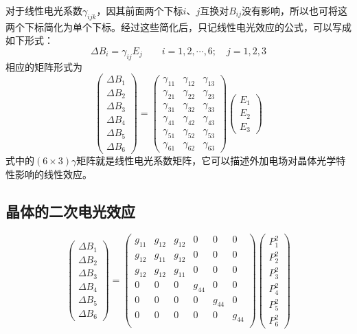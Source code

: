 \documentclass[cn,10pt,chinesefont=founder,math=mtpro2,cite=super,toc=onecol,twoside]{elegantbook}
\begin{document}
对于线性电光系数$\gamma_{ijk}$，因其前面两个下标$i$、$j$互换对$B_{ij}$没有影响，所以也可将这两个下标简化为单个下标。经过这些简化后，只记线性电光效应的公式，可以写成如下形式：
\begin{equation}
\Delta B_i=\gamma_{ij}E_{j}\qquad i=1,2,\cdots,6;\quad j=1,2,3
\end{equation}
相应的矩阵形式为
\begin{equation}
\begin{pmatrix}
\Delta B_1\\
\Delta B_2\\
\Delta B_3\\
\Delta B_4\\
\Delta B_5\\
\Delta B_6
\end{pmatrix}=
\begin{pmatrix}
\gamma_{11}&\gamma_{12}&\gamma_{13}\\
\gamma_{21}&\gamma_{22}&\gamma_{23}\\
\gamma_{31}&\gamma_{32}&\gamma_{33}\\
\gamma_{41}&\gamma_{42}&\gamma_{43}\\
\gamma_{51}&\gamma_{52}&\gamma_{53}\\
\gamma_{61}&\gamma_{62}&\gamma_{63}
\end{pmatrix}
\begin{pmatrix}
E_1\\
E_2\\
E_3
\end{pmatrix}
\end{equation}
式中的$(6\times3)\gamma$矩阵就是线性电光系数矩阵，它可以描述外加电场对晶体光学特性影响的线性效应。

\subsection{晶体的二次电光效应}

\begin{equation}
\begin{pmatrix}
\Delta B_1\\
\Delta B_2\\
\Delta B_3\\
\Delta B_4\\
\Delta B_5\\
\Delta B_6
\end{pmatrix}=
\begin{pmatrix}
g_{11}&g_{12}&g_{12}&0&0&0\\
g_{12}&g_{11}&g_{12}&0&0&0\\
g_{12}&g_{12}&g_{11}&0&0&0\\
0&0&0&g_{44}&0&0\\
0&0&0&0&g_{44}&0\\
0&0&0&0&0&g_{44}\\
\end{pmatrix}
\begin{pmatrix}
P^2_1\\
P^2_2\\
P^2_3\\
P^2_4\\
P^2_5\\
P^2_6
\end{pmatrix}
\end{equation}
\end{document}
